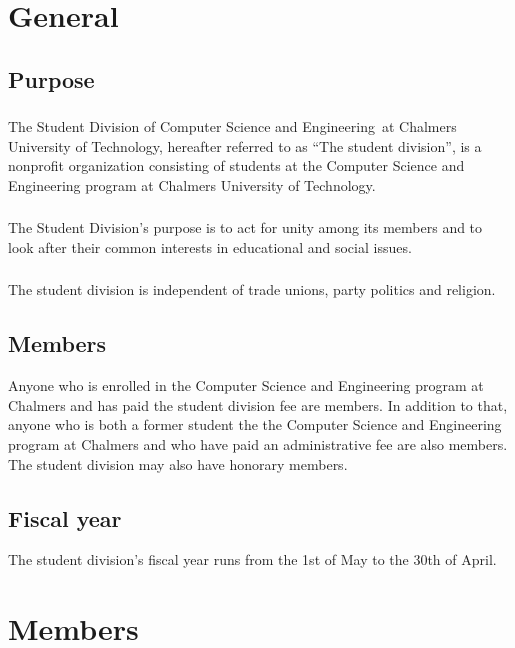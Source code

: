 \documentclass[a4paper]{dtek}
\newcommand{\sdocsae}{Student Division of Computer Science and Engineering~}
\begin{document}
\newpage

\section{General}
\subsection{Purpose} 
\subsubsection{}
The \sdocsae at Chalmers University of Technology, hereafter referred to as ``The student division'', is a nonprofit organization consisting of students at the Computer Science and Engineering program at Chalmers University of Technology.
\subsubsection{}
The Student Division's purpose is to act for unity among its members and to look after their common interests in educational and social issues. 
\subsubsection{}
The student division is independent of trade unions, party politics and religion.

\subsection{Members}
Anyone who is enrolled in the Computer Science and Engineering program at Chalmers and has paid the student division fee are members. In addition to that, anyone who is both a former student the the Computer Science and Engineering program at Chalmers and who have paid an administrative fee are also members. The student division may also have honorary members.  

\subsection{Fiscal year}
The student division's fiscal year runs from the 1st of May to the 30th of April.
\newpage

\section{Members}
\end{document}
